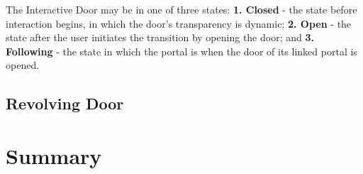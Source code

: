 The Interactive Door may be in one of three states: \textbf{1. Closed} - the state before interaction begins, in which the door's transparency 
is dynamic; \textbf{2. Open} - the state after the user initiates the transition by opening the door; and \textbf{3. Following} - the state in 
which the portal is when the door of its linked portal is opened.




\subsection{Revolving Door}
\label{sec:rev-door}

\section{Summary}
\label{sec:summary}
